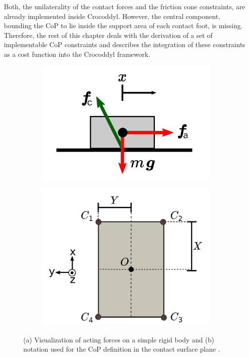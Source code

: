 Both, the unilaterality of the contact forces and the friction cone constraints, are already implemented inside Crocoddyl. However, the central component, bounding the \gls{CoP} to lie inside the support area of each contact foot, is missing. Therefore, the rest of this chapter deals with the derivation of a set of implementable \gls{CoP} constraints and describes the integration of these constraints as a cost function into the Crocoddyl framework.
\begin{figure}[t]
	\begin{subfigure}{.5\textwidth}
		\centering
		\includegraphics[width=.95\linewidth]{img/simple_contact}
		\caption{}
		\label{img:simple_contact}
	\end{subfigure}%
	\begin{subfigure}{.5\textwidth}
		\centering
		\includegraphics[width=.77\linewidth]{img/contact_surface}
		\caption{}
		\label{img:contact_surface}
	\end{subfigure}
	\caption[Simplified contact situation and CoP notation]{(a) Visualization of acting forces on a simple rigid body and (b) notation used for the \gls{CoP} definition in the contact surface plane \cite{caron2015stability}.}
	\label{fig:natural2robot}
\end{figure}


